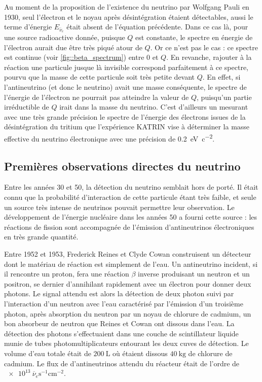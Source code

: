 	         Au moment de la proposition de l'existence du neutrino par Wolfgang Pauli en 1930\cite{Pauli1930}, seul l'électron et le noyau après désintégration étaient détectables, aussi le terme d'énergie $E_{\overline{\nu}_e}$ était absent de l'équation précédente. Dans ce cas là, pour une source radioactive donnée, puisque $Q$ est constante, le spectre en énergie de l'électron aurait due être très piqué atour de $Q$. Or ce n'est pas le cas : ce spectre est continue (voir \autoref{fig::beta_spectrum}) entre 0 et $Q$. En revanche, rajouter à la réaction une particule jusque là invisible correspond parfaitement à ce spectre, pourvu que la masse de cette particule soit très petite devant $Q$. En effet, si l'antineutrino (et donc le neutrino) avait une masse conséquente, le spectre de l'énergie de l'électron ne pourrait pas atteindre la valeur de $Q$, puisqu'un partie irréductible de $Q$ irait dans la masse du neutrino. C'est d'ailleurs un mesurant avec une très grande précision le spectre de l'énergie des électrons issues de la désintégration du tritium que l'expérience KATRIN\cite{Kleesiek2018} vise à déterminer la masse effective du neutrino électronique avec une précision de \SI{0.2}{\electronvolt\per c\squared}.
    
        \subsection{Premières observations directes du neutrino}
        
	        Entre les années 30 et 50, la détection du neutrino semblait hors de porté. Il était connu que la probabilité d'interaction de cette particule étant très faible, et seule un source très intense de neutrinos pouvait permettre leur observation. Le développement de l'énergie nucléaire dans les années 50 a fourni cette source : les réactions de fission sont accompagnée de l'émission d'antineutrinos électroniques en très grande quantité.
	        
	        Entre 1952 et 1953, Frederick Reines et Clyde Cowan construisent un détecteur dont le matériau de réaction est simplement de l'eau. Un antineutrino incident, si il rencontre un proton, fera une réaction $\beta$ inverse produisant un neutron et un positron, se dernier d'annihilant rapidement avec un électron pour donner deux photons. Le signal attendu est alors la détection de deux photon suivi par l'interaction d'un neutron avec l'eau caractérisé par l'émission d'un troisième photon, après absorption du neutron par un noyau de chlorure de cadmium, un bon absorbeur de neutron que Reines et Cowan ont dissous dans l'eau. La détection des photons s'effectuaient dans une couche de scintillateur liquide munie de tubes photomultiplicateurs entourant les deux cuves de détection. Le volume d'eau totale était de $\SI{200}{\liter}$ où étaient dissous $\SI{40}{\kilogram}$ de chlorure de cadmium. Le flux de d'antineutrinos attendu du réacteur était de l'ordre de $\SI{e13}{\overline{\nu}_e\second^{-1}\centi\meter^{-2}}$.
	    
